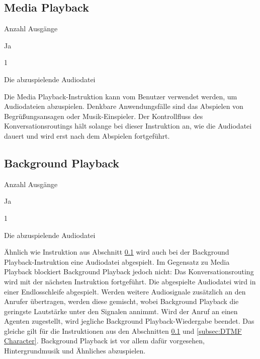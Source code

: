 \subsection{Media Playback}
\label{subsec:Media Playback}
\begin{labeling}{Anzahl Ausgänge}
\item [Eingang] Ja
\item [Anzahl Ausgänge] 1
\item [Parameter] Die abzuspielende Audiodatei
\item [Beschreibung] Die Media Playback-Instruktion kann vom Benutzer verwendet werden, um Audiodateien abzuspielen. Denkbare Anwendungsfälle sind das Abspielen von Begrüßungsansagen oder Musik-Einspieler. Der Kontrollfluss des Konversationsroutings hält solange bei dieser Instruktion an, wie die Audiodatei dauert und wird erst nach dem Abspielen fortgeführt.
\end{labeling}

\subsection{Background Playback}
\begin{labeling}{Anzahl Ausgänge}
\item [Eingang] Ja
\item [Anzahl Ausgänge] 1
\item [Parameter] Die abzuspielende Audiodatei
\item [Beschreibung] Ähnlich wie Instruktion aus Abschnitt \ref{subsec:Media Playback} wird auch bei der Background Playback-Instruktion eine Audiodatei abgespielt. Im Gegensatz zu Media Playback blockiert Background Playback jedoch nicht: Das Konversationsrouting wird mit der nächsten Instruktion fortgeführt. Die abgespielte Audiodatei wird in einer Endlosschleife abgespielt. Werden weitere Audiosignale zusätzlich an den Anrufer übertragen, werden diese gemischt, wobei Background Playback die geringste Lautstärke unter den Signalen annimmt. Wird der Anruf an einen Agenten zugestellt, wird jegliche Background Playback-Wiedergabe beendet. Das gleiche gilt für die Instruktionen aus den Abschnitten \ref{subsec:Media Playback} und \ref{subsec:DTMF Character}. Background Playback ist vor allem dafür vorgesehen, Hintergrundmusik und Ähnliches abzuspielen.
\end{labeling}

